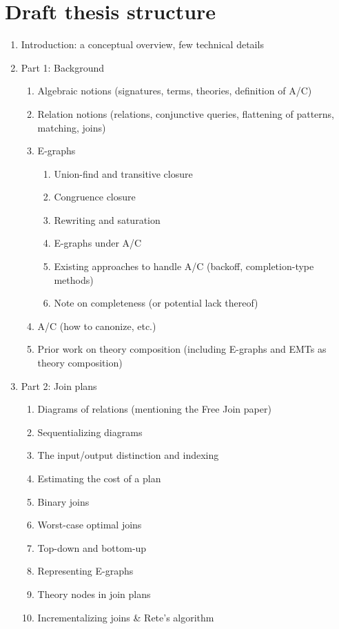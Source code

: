 \documentclass{article}
\theoremstyle{definition}
\begin{document}
\section{Draft thesis structure}
\begin{enumerate}
	\item Introduction: a conceptual overview, few technical details
	\item Part 1: Background
		\begin{enumerate}
			\item Algebraic notions (signatures, terms, theories, definition of A/C)
			\item Relation notions (relations, conjunctive queries, flattening of patterns, matching, joins)
			\item E-graphs
				\begin{enumerate}
					\item Union-find and transitive closure
					\item Congruence closure
					\item Rewriting and saturation
					\item E-graphs under A/C
					\item Existing approaches to handle A/C (backoff, completion-type methods)
					\item Note on completeness (or potential lack thereof)
				\end{enumerate}
			\item A/C (how to canonize, etc.)
			\item Prior work on theory composition (including E-graphs and EMTs as theory composition)
		\end{enumerate}
	\item Part 2: Join plans
		\begin{enumerate}
			\item Diagrams of relations (mentioning the Free Join paper)
			\item Sequentializing diagrams
			\item The input/output distinction and indexing
			\item Estimating the cost of a plan
			\item Binary joins
			\item Worst-case optimal joins
			\item Top-down and bottom-up
			\item Representing E-graphs
			\item Theory nodes in join plans
			\item Incrementalizing joins \& Rete's algorithm

\end{enumerate}
\end{enumerate}
\end{document}

